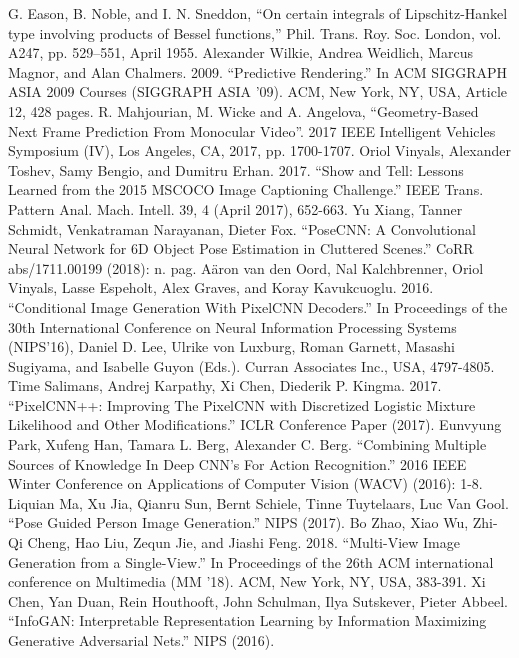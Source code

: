 \documentclass[conference]{IEEEtran}
\begin{document}
\begin{thebibliography}{12}
 G. Eason, B. Noble, and I. N. Sneddon, ``On certain integrals of Lipschitz-Hankel type involving products of Bessel functions,'' Phil. Trans. Roy. Soc. London, vol. A247, pp. 529--551, April 1955.
 Alexander Wilkie, Andrea Weidlich, Marcus Magnor, and Alan Chalmers. 2009. ``Predictive Rendering.'' In ACM SIGGRAPH ASIA 2009 Courses (SIGGRAPH ASIA '09). ACM, New York, NY, USA, Article 12, 428 pages.
 R. Mahjourian, M. Wicke and A. Angelova, ``Geometry-Based Next Frame Prediction From Monocular Video''. 2017 IEEE Intelligent Vehicles Symposium (IV), Los Angeles, CA, 2017, pp. 1700-1707.
 Oriol Vinyals, Alexander Toshev, Samy Bengio, and Dumitru Erhan. 2017. ``Show and Tell: Lessons Learned from the 2015 MSCOCO Image Captioning Challenge.'' IEEE Trans. Pattern Anal. Mach. Intell. 39, 4 (April 2017), 652-663.
 Yu Xiang, Tanner Schmidt, Venkatraman Narayanan, Dieter Fox. ``PoseCNN: A Convolutional Neural Network for 6D Object Pose Estimation in Cluttered Scenes.'' CoRR abs/1711.00199 (2018): n. pag.
 A\"{a}ron van den Oord, Nal Kalchbrenner, Oriol Vinyals, Lasse Espeholt, Alex Graves, and Koray Kavukcuoglu. 2016. ``Conditional Image Generation With PixelCNN Decoders.'' In Proceedings of the 30th International Conference on Neural Information Processing Systems (NIPS'16), Daniel D. Lee, Ulrike von Luxburg, Roman Garnett, Masashi Sugiyama, and Isabelle Guyon (Eds.). Curran Associates Inc., USA, 4797-4805.
 Time Salimans, Andrej Karpathy, Xi Chen, Diederik P. Kingma. 2017. ``PixelCNN++: Improving The PixelCNN with Discretized Logistic Mixture Likelihood and Other Modifications.'' ICLR Conference Paper (2017).
 Eunvyung Park, Xufeng Han, Tamara L. Berg, Alexander C. Berg. ``Combining Multiple Sources of Knowledge In Deep CNN's For Action Recognition.'' 2016 IEEE Winter Conference on Applications of Computer Vision (WACV) (2016): 1-8.
 Liquian Ma, Xu Jia, Qianru Sun, Bernt Schiele, Tinne Tuytelaars, Luc Van Gool. ``Pose Guided Person Image Generation.'' NIPS (2017).
 Bo Zhao, Xiao Wu, Zhi-Qi Cheng, Hao Liu, Zequn Jie, and Jiashi Feng. 2018. ``Multi-View Image Generation from a Single-View.'' In Proceedings of the 26th ACM international conference on Multimedia (MM '18). ACM, New York, NY, USA, 383-391.
 Xi Chen, Yan Duan, Rein Houthooft, John Schulman, Ilya Sutskever, Pieter Abbeel. ``InfoGAN: Interpretable Representation Learning by Information Maximizing Generative Adversarial Nets.'' NIPS (2016).

\end{thebibliography}
\end{document}
